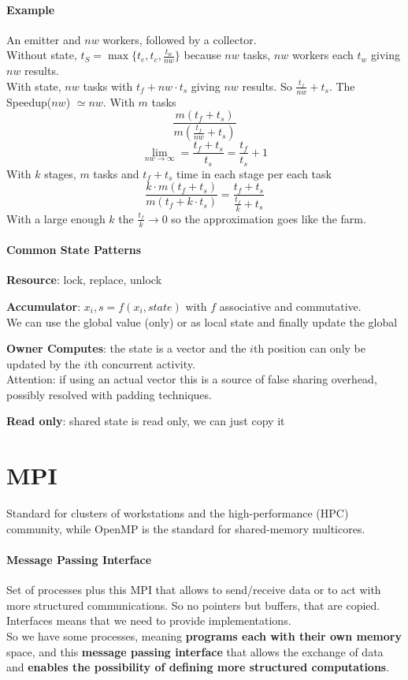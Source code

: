\documentclass[10pt]{report}
\begin{document}
\paragraph{Example} An emitter and $nw$ workers, followed by a collector.\\
Without state, $t_S=\max\{t_e, t_c, \frac{t_w}{nw}\}$ because $nw$ tasks, $nw$ workers each $t_w$ giving $nw$ results.\\
With state, $nw$ tasks with $t_f+nw\cdot t_s$ giving $nw$ results. So $\frac{t_f}{nw}+t_s$. The Speedup($nw$) $\simeq nw$. With $m$ tasks
$$\frac{m(t_f + t_s)}{m(\frac{t_f}{nw}+t_s)}$$
$$\lim_{nw\to\infty} = \frac{t_f + t_s}{t_s} = \frac{t_f}{t_s} + 1$$
With $k$ stages, $m$ tasks and $t_f+t_s$ time in each stage per each task
$$\frac{k\cdot m(t_f+t_s)}{m(t_f + k\cdot t_s)} = \frac{t_f + t_s}{\frac{t_f}{k} + t_s}$$
With a large enough $k$ the $\frac{t_f}{k}\rightarrow 0$ so the approximation goes like the farm.
\paragraph{Common State Patterns}\begin{list}{}{}
	\item \textbf{Resource}: lock, replace, unlock
	\item \textbf{Accumulator}: $x_i, s= f(x_i, state)$ with $f$ associative and commutative.\\
	We can use the global value (only) or as local state and finally update the global
	\item \textbf{Owner Computes}: the state is a vector and the $i$th position can only be updated by the $i$th concurrent activity.\\
	Attention: if using an actual vector this is a source of false sharing overhead, possibly resolved with padding techniques.
	\item \textbf{Read only}: shared state is read only, we can just copy it
\end{list}
\section{MPI}
Standard for clusters of workstations and the high-performance (HPC) community, while OpenMP is the standard for shared-memory multicores.
\paragraph{Message Passing Interface} Set of processes plus this MPI that allows to send/receive data or to act with more structured communications. So no pointers but buffers, that are copied. Interfaces means that we need to provide implementations.\\
So we have some processes, meaning \textbf{programs each with their own memory} space, and this \textbf{message passing interface} that allows the exchange of data and \textbf{enables the possibility of defining more structured computations}.
\end{document}
